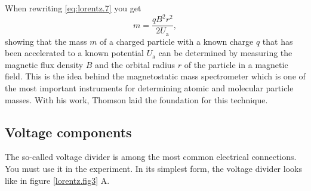\documentclass[../Elmag-labhefte-2020.tex]{subfiles}
\begin{document}
When rewriting \eqref{eq:lorentz.7} you get
\begin{equation}
    m = \frac{q B^2 r^2}{2 U_\mathrm{a}},
    \label{eq:lorentz.8}
\end{equation}
%
showing that the mass $m$ of a charged particle with a known charge $q$ that has been accelerated to a known potential $U_\mathrm{a}$ can be determined by measuring the magnetic flux density $B$ and the orbital radius $r$ of the particle in a magnetic field. This is the idea behind the magnetostatic mass spectrometer which is one of the most important instruments for determining atomic and molecular particle masses. With his work, Thomson laid the foundation for this technique.

\subsection{Voltage components \label{lorentz.spenningsdeler}}
 
The so-called voltage divider is among the most common electrical connections. You must use it in the experiment. In its simplest form, the voltage divider looks like in figure \ref{lorentz.fig3} A.
\end{document}
